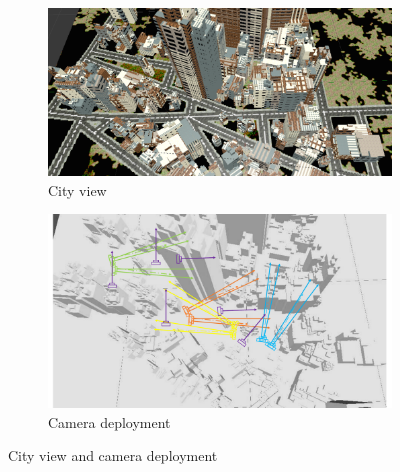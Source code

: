\begin{figure}[t]
\begin{center}
\begin{subfigure}[b]{0.9\columnwidth}
\includegraphics[width=0.9\columnwidth]{./fig/cityView.pdf}
\caption{\label{fig::cityView}City view}
\end{subfigure}
\hfill
\begin{subfigure}[b]{0.9\columnwidth}
\includegraphics[width=0.9\columnwidth]{./fig/newCameraDeployment.pdf}
\caption{\label{fig::cameraDeployment}Camera deployment}
\end{subfigure}
\caption{\label{fig::cityAndCamera}City view and camera deployment}
\end{center}
\end{figure}

